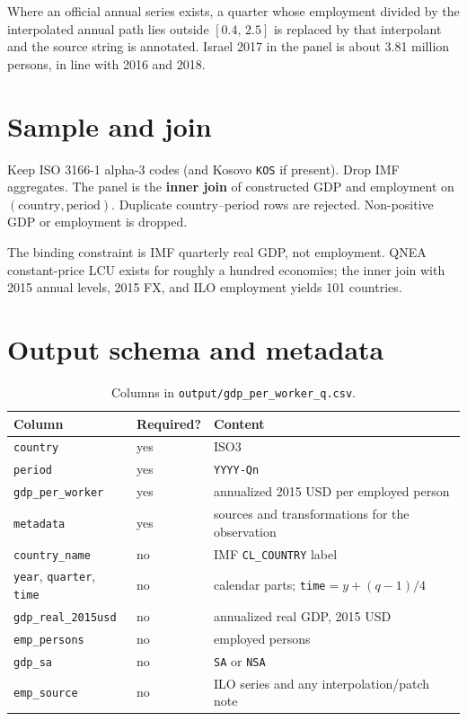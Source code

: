 \documentclass[11pt]{article}
\begin{document}
Where an official annual series exists, a quarter whose employment divided
by the interpolated annual path lies outside $[0.4,\,2.5]$ is replaced by
that interpolant and the source string is annotated. Israel 2017 in the
panel is about 3.81 million persons, in line with 2016 and 2018.

\section{Sample and join}

Keep ISO 3166-1 alpha-3 codes (and Kosovo \texttt{KOS} if present). Drop IMF
aggregates. The panel is the \textbf{inner join} of constructed GDP and
employment on $(\mathrm{country},\mathrm{period})$. Duplicate
country--period rows are rejected. Non-positive GDP or employment is
dropped.

The binding constraint is IMF quarterly real GDP, not employment. QNEA
constant-price LCU exists for roughly a hundred economies; the inner join
with 2015 annual levels, 2015 FX, and ILO employment yields 101 countries.

\section{Output schema and metadata}

\begin{table}[h]
\centering
\caption{Columns in \texttt{output/gdp\_per\_worker\_q.csv}.}
\begin{tabular}{lll}
\toprule
Column & Required? & Content \\
\midrule
\texttt{country} & yes & ISO3 \\
\texttt{period} & yes & \texttt{YYYY-Qn} \\
\texttt{gdp\_per\_worker} & yes & annualized 2015 USD per employed person \\
\texttt{metadata} & yes & sources and transformations for the observation \\
\texttt{country\_name} & no & IMF \texttt{CL\_COUNTRY} label \\
\texttt{year}, \texttt{quarter}, \texttt{time} & no & calendar parts; \texttt{time}$=y+(q-1)/4$ \\
\texttt{gdp\_real\_2015usd} & no & annualized real GDP, 2015 USD \\
\texttt{emp\_persons} & no & employed persons \\
\texttt{gdp\_sa} & no & \texttt{SA} or \texttt{NSA} \\
\texttt{emp\_source} & no & ILO series and any interpolation/patch note \\
\bottomrule
\end{tabular}
\end{table}
\end{document}
